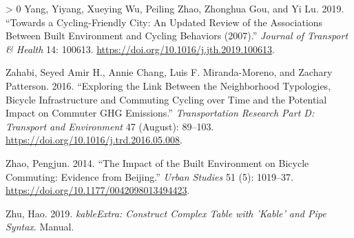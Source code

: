 \documentclass[smallextended]{svjour3}       %
\newlength{\cslhangindent}
\newenvironment{CSLReferences}[3] %
 {%
  \setlength{\parindent}{0pt}
  \ifodd #1 \everypar{\setlength{\hangindent}{\cslhangindent}}\ignorespaces\fi
  \ifnum #2 > 0
  \setlength{\parskip}{#2\baselineskip}
  \fi
 }%
 {}
\begin{document}
\begin{CSLReferences}{1}{0}
\leavevmode\hypertarget{ref-yangCyclingfriendlyCityUpdated2019}{}%
Yang, Yiyang, Xueying Wu, Peiling Zhao, Zhonghua Gou, and Yi Lu. 2019.
{``Towards a Cycling-Friendly City: {An} Updated Review of the
Associations Between Built Environment and Cycling Behaviors
(2007{}).''} \emph{Journal of Transport \& Health} 14: 100613.
\url{https://doi.org/10.1016/j.jth.2019.100613}.

\leavevmode\hypertarget{ref-Zahabi2016}{}%
Zahabi, Seyed Amir H., Annie Chang, Luis F. Miranda-Moreno, and Zachary
Patterson. 2016. {``Exploring the Link Between the Neighborhood
Typologies, Bicycle Infrastructure and Commuting Cycling over Time and
the Potential Impact on Commuter {GHG} Emissions.''}
\emph{Transportation Research Part D: Transport and Environment} 47
(August): 89--103. \url{https://doi.org/10.1016/j.trd.2016.05.008}.

\leavevmode\hypertarget{ref-Zhao2014}{}%
Zhao, Pengjun. 2014. {``The Impact of the Built Environment on Bicycle
Commuting: {Evidence} from Beijing.''} \emph{Urban Studies} 51 (5):
1019--37. \url{https://doi.org/10.1177/0042098013494423}.

\leavevmode\hypertarget{ref-Zhu2019}{}%
Zhu, Hao. 2019. \emph{{kableExtra}: {Construct} Complex Table with
'Kable' and Pipe Syntax}. Manual.

\end{CSLReferences}




\end{document}

